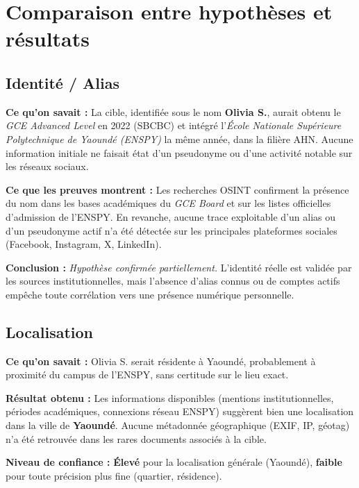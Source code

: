\documentclass[a4paper,12pt]{report}
\begin{document}
\chapter{Comparaison entre hypothèses et résultats}

\section{Identité / Alias}

\textbf{Ce qu’on savait :}  
La cible, identifiée sous le nom \textbf{Olivia S.}, aurait obtenu le \textit{GCE Advanced Level} en 2022 (SBCBC) et intégré l’\textit{École Nationale Supérieure Polytechnique de Yaoundé (ENSPY)} la même année, dans la filière AHN.  
Aucune information initiale ne faisait état d’un pseudonyme ou d’une activité notable sur les réseaux sociaux.

\textbf{Ce que les preuves montrent :}  
Les recherches OSINT confirment la présence du nom dans les bases académiques du \textit{GCE Board} et sur les listes officielles d’admission de l’ENSPY.  
En revanche, aucune trace exploitable d’un alias ou d’un pseudonyme actif n’a été détectée sur les principales plateformes sociales (Facebook, Instagram, X, LinkedIn).

\textbf{Conclusion :}  
\textit{Hypothèse confirmée partiellement.}  
L’identité réelle est validée par les sources institutionnelles, mais l’absence d’alias connus ou de comptes actifs empêche toute corrélation vers une présence numérique personnelle.

\section{Localisation}

\textbf{Ce qu’on savait :}  
Olivia S. serait résidente à Yaoundé, probablement à proximité du campus de l’ENSPY, sans certitude sur le lieu exact.

\textbf{Résultat obtenu :}  
Les informations disponibles (mentions institutionnelles, périodes académiques, connexions réseau ENSPY) suggèrent bien une localisation dans la ville de \textbf{Yaoundé}.  
Aucune métadonnée géographique (EXIF, IP, géotag) n’a été retrouvée dans les rares documents associés à la cible.

\textbf{Niveau de confiance :}  
\textbf{Élevé} pour la localisation générale (Yaoundé),  
\textbf{faible} pour toute précision plus fine (quartier, résidence).
\end{document}
